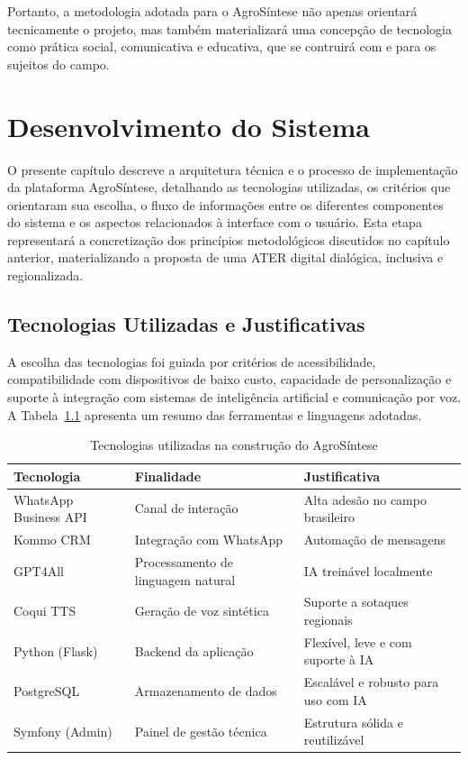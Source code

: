 Portanto, a metodologia adotada para o AgroSíntese não apenas orientará tecnicamente o projeto, mas também materializará uma concepção de tecnologia como prática social, comunicativa e educativa, que se contruirá com e para os sujeitos do campo.






\chapter{Desenvolvimento do Sistema}

O presente capítulo descreve a arquitetura técnica e o processo de implementação da plataforma AgroSíntese, detalhando as tecnologias utilizadas, os critérios que orientaram sua escolha, o fluxo de informações entre os diferentes componentes do sistema e os aspectos relacionados à interface com o usuário. Esta etapa representará a concretização dos princípios metodológicos discutidos no capítulo anterior, materializando a proposta de uma ATER digital dialógica, inclusiva e regionalizada.

\section{Tecnologias Utilizadas e Justificativas}

A escolha das tecnologias foi guiada por critérios de acessibilidade, compatibilidade com dispositivos de baixo custo, capacidade de personalização e suporte à integração com sistemas de inteligência artificial e comunicação por voz. A Tabela~\ref{tab:tecnologias} apresenta um resumo das ferramentas e linguagens adotadas.

\begin{table}[H]
	\centering
	\caption{Tecnologias utilizadas na construção do AgroSíntese}
	\label{tab:tecnologias}
	\begin{tabular}{|l|l|l|}
		\hline
		\textbf{Tecnologia} & \textbf{Finalidade} & \textbf{Justificativa} \\
		\hline
		WhatsApp Business API & Canal de interação & Alta adesão no campo brasileiro \\
		Kommo CRM & Integração com WhatsApp & Automação de mensagens \\
		GPT4All & Processamento de linguagem natural & IA treinável localmente\\
		Coqui TTS & Geração de voz sintética & Suporte a sotaques regionais \\
		Python (Flask) & Backend da aplicação & Flexível, leve e com  suporte à IA \\
		PostgreSQL & Armazenamento de dados & Escalável e robusto para uso com IA \\
		Symfony (Admin) & Painel de gestão técnica & Estrutura sólida e reutilizável \\
		\hline
	\end{tabular}
\end{table}


